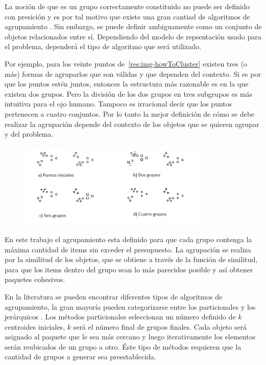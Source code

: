 La noción de que es un grupo correctamente constituido no puede ser definido con presición y es por tal motivo que existe una gran cantiad de algoritmos de agrupamiento \cite{Estivill-Castro:2002:WSM:568574.568575}. Sin embargo, se puede definir ambiguamente como un conjunto de objetos relacionados entre sí. Dependiendo del modelo de repsentación usado para el problema, dependerá el tipo de algoritmo que será utilizado.

Por ejemplo, para los veinte puntos de~\autoref{res:img-howToCluster} existen tres (o más) formas de agruparlos que son válidas y que dependen del contexto. Si es por que los puntos estén juntos, entonces la estructura más razonable es en la que existen dos grupos. Pero la división de los dos grupos en tres subgrupos es más intuitiva para el ojo humano. Tampoco es irracional decir que los puntos pertenecen a cuatro conjuntos. Por lo tanto la mejor definición de cómo se debe realizar la agrupación depende del contexto de los objetos que se quieren agrupar y del problema.

\begin{figure}[H]
  \centering
   \includegraphics[width=0.8\textwidth]{img/howToCluster.png}
   \caption{}
   \label{res:img-howToCluster}
\end{figure}
En este trabajo el agrupamiento esta definido para que cada grupo contenga la máxima cantidad de items sin exceder el presupuesto. La agrupación se realiza por la similitud de los objetos, que se obtiene a través de la función de similitud, para que los items dentro del grupo sean lo más parecidos posible y así obtener paquetes cohesivos.

En la literatura se pueden encontrar diferentes tipos de algoritmos de agrupamiento, la gran mayoría pueden categorizarse entre los particionales y los jerárquicos \cite{opac-b1087461}. Los métodos particionales seleccionan un número definido de $k$ centroides iniciales, $k$ será el número final de grupos finales. Cada objeto será asignado al paquete que le sea más cercano y luego iterativamente los elementos serán reubicados de un grupo a otro. Éste tipo de métodos requieren que la cantidad de grupos a generar sea preestablecida. 

